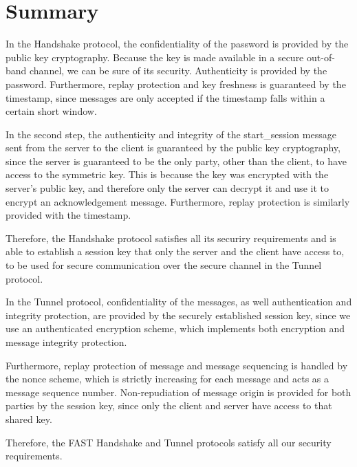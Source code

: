 \documentclass[12pt]{article}
\begin{document}
\section{Summary}

In the Handshake protocol, the confidentiality of the password is provided by the public key cryptography. Because the key is made available in a secure out-of-band channel, we can be sure of its security. Authenticity is provided by the password. Furthermore, replay protection and key freshness is guaranteed by the timestamp, since messages are only accepted if the timestamp falls within a certain short window.

In the second step, the authenticity and integrity of the start\_session message sent from the server to the client is guaranteed by the public key cryptography, since the server is guaranteed to be the only party, other than the client, to have access to the symmetric key. This is because the key was encrypted with the server’s public key, and therefore only the server can decrypt it and use it to encrypt an acknowledgement message. Furthermore, replay protection is similarly provided with the timestamp.

Therefore, the Handshake protocol satisfies all its securiry requirements and is able to establish a session key that only the server and the client have access to, to be used for secure communication over the secure channel in the Tunnel protocol.

In the Tunnel protocol, confidentiality of the messages, as well authentication and integrity protection, are provided by the securely established session key, since we use an authenticated encryption scheme, which implements both encryption and message integrity protection.

Furthermore, replay protection of message and message sequencing is handled by the nonce scheme, which is strictly increasing for each message and acts as a message sequence number. Non-repudiation of message origin is provided for both parties by the session key, since only the client and server have access to that shared key.

Therefore, the FAST Handshake and Tunnel protocols satisfy all our security requirements.
\end{document}
